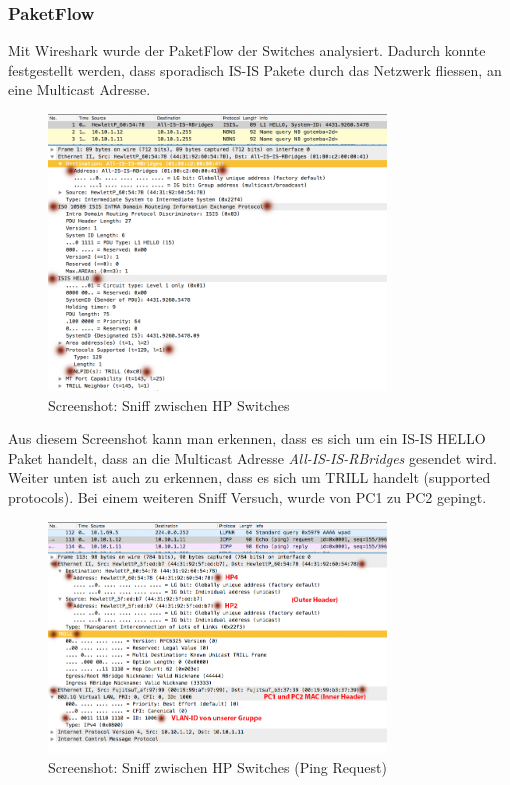 \documentclass[a4,12pt]{scrartcl}
\begin{document}
\subsubsection{PaketFlow}
Mit Wireshark wurde der PaketFlow der Switches analysiert. Dadurch konnte festgestellt werden, dass sporadisch IS-IS Pakete durch das Netzwerk fliessen, an eine Multicast Adresse. 
\begin{figure} [H]
	\begin{center}
	\includegraphics[width=0.80\textwidth]{./pictures/capture_isis.png}
	\caption{Screenshot: Sniff zwischen HP Switches}
	\label{x}
	\end{center}
\end{figure}
\noindent Aus diesem Screenshot kann man erkennen, dass es sich um ein IS-IS HELLO Paket handelt, dass an die Multicast Adresse \textit{All-IS-IS-RBridges} gesendet wird. Weiter unten ist auch zu erkennen, dass es sich um TRILL handelt (supported protocols). 
\newpage
Bei einem weiteren Sniff Versuch, wurde von PC1 zu PC2 gepingt. 
\begin{figure} [H]
	\begin{center}
	\includegraphics[width=0.80\textwidth]{./pictures/capture_ping.png}
	\caption{Screenshot: Sniff zwischen HP Switches (Ping Request)}
	\label{x}
	\end{center}
\end{figure}
\end{document}

